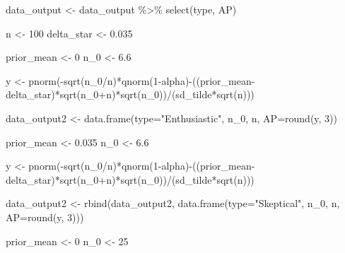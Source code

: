\documentclass[
]{book}
\newenvironment{Shaded}{\begin{snugshade}}{\end{snugshade}}
\newcommand{\AttributeTok}[1]{\textcolor[rgb]{0.77,0.63,0.00}{#1}}
\newcommand{\DecValTok}[1]{\textcolor[rgb]{0.00,0.00,0.81}{#1}}
\newcommand{\FloatTok}[1]{\textcolor[rgb]{0.00,0.00,0.81}{#1}}
\newcommand{\FunctionTok}[1]{\textcolor[rgb]{0.00,0.00,0.00}{#1}}
\newcommand{\NormalTok}[1]{#1}
\newcommand{\OtherTok}[1]{\textcolor[rgb]{0.56,0.35,0.01}{#1}}
\newcommand{\SpecialCharTok}[1]{\textcolor[rgb]{0.00,0.00,0.00}{#1}}
\newcommand{\StringTok}[1]{\textcolor[rgb]{0.31,0.60,0.02}{#1}}
\begin{document}
\begin{Shaded}
\begin{Highlighting}[]
\NormalTok{data\_output }\OtherTok{\textless{}{-}}\NormalTok{ data\_output }\SpecialCharTok{\%\textgreater{}\%} \FunctionTok{select}\NormalTok{(type, AP)}

\NormalTok{n }\OtherTok{\textless{}{-}} \DecValTok{100}
\NormalTok{delta\_star }\OtherTok{\textless{}{-}} \FloatTok{0.035}


\NormalTok{prior\_mean }\OtherTok{\textless{}{-}} \DecValTok{0}
\NormalTok{n\_0 }\OtherTok{\textless{}{-}} \FloatTok{6.6}

\NormalTok{y }\OtherTok{\textless{}{-}} \FunctionTok{pnorm}\NormalTok{(}\SpecialCharTok{{-}}\FunctionTok{sqrt}\NormalTok{(n\_0}\SpecialCharTok{/}\NormalTok{n)}\SpecialCharTok{*}\FunctionTok{qnorm}\NormalTok{(}\DecValTok{1}\SpecialCharTok{{-}}\NormalTok{alpha)}\SpecialCharTok{{-}}\NormalTok{((prior\_mean}\SpecialCharTok{{-}}\NormalTok{delta\_star)}\SpecialCharTok{*}\FunctionTok{sqrt}\NormalTok{(n\_0}\SpecialCharTok{+}\NormalTok{n)}\SpecialCharTok{*}\FunctionTok{sqrt}\NormalTok{(n\_0))}\SpecialCharTok{/}\NormalTok{(sd\_tilde}\SpecialCharTok{*}\FunctionTok{sqrt}\NormalTok{(n)))}

\NormalTok{data\_output2 }\OtherTok{\textless{}{-}} \FunctionTok{data.frame}\NormalTok{(}\AttributeTok{type=}\StringTok{"Enthusiastic"}\NormalTok{, n\_0, n, }\AttributeTok{AP=}\FunctionTok{round}\NormalTok{(y, }\DecValTok{3}\NormalTok{))}

\NormalTok{prior\_mean }\OtherTok{\textless{}{-}} \FloatTok{0.035}
\NormalTok{n\_0 }\OtherTok{\textless{}{-}} \FloatTok{6.6}

\NormalTok{y }\OtherTok{\textless{}{-}} \FunctionTok{pnorm}\NormalTok{(}\SpecialCharTok{{-}}\FunctionTok{sqrt}\NormalTok{(n\_0}\SpecialCharTok{/}\NormalTok{n)}\SpecialCharTok{*}\FunctionTok{qnorm}\NormalTok{(}\DecValTok{1}\SpecialCharTok{{-}}\NormalTok{alpha)}\SpecialCharTok{{-}}\NormalTok{((prior\_mean}\SpecialCharTok{{-}}\NormalTok{delta\_star)}\SpecialCharTok{*}\FunctionTok{sqrt}\NormalTok{(n\_0}\SpecialCharTok{+}\NormalTok{n)}\SpecialCharTok{*}\FunctionTok{sqrt}\NormalTok{(n\_0))}\SpecialCharTok{/}\NormalTok{(sd\_tilde}\SpecialCharTok{*}\FunctionTok{sqrt}\NormalTok{(n)))}

\NormalTok{data\_output2 }\OtherTok{\textless{}{-}} \FunctionTok{rbind}\NormalTok{(data\_output2, }\FunctionTok{data.frame}\NormalTok{(}\AttributeTok{type=}\StringTok{"Skeptical"}\NormalTok{, n\_0, n, }\AttributeTok{AP=}\FunctionTok{round}\NormalTok{(y, }\DecValTok{3}\NormalTok{)))}

\NormalTok{prior\_mean }\OtherTok{\textless{}{-}} \DecValTok{0}
\NormalTok{n\_0 }\OtherTok{\textless{}{-}} \DecValTok{25}


\end{Highlighting}
\end{Shaded}
\end{document}
